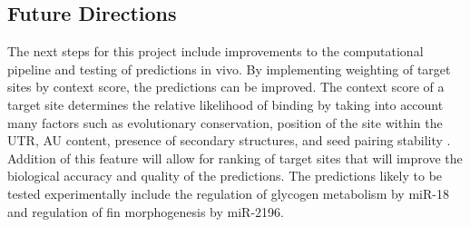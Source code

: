 \documentclass[12pt]{article}
\begin{document}
\subsection{Future Directions}

The next steps for this project include improvements to the computational pipeline and testing of predictions in vivo. By implementing weighting of target sites by context score, the predictions can be improved. The context score of a target site determines the relative likelihood of binding by taking into account many factors such as evolutionary conservation, position of the site within the UTR, AU content, presence of secondary structures, and seed pairing stability \cite{agarwal2015predicting}. Addition of this feature will allow for ranking of target sites that will improve the biological accuracy and quality of the predictions. The predictions likely to be tested experimentally include the regulation of glycogen metabolism by miR-18 and regulation of fin morphogenesis by miR-2196.

\newpage


\newpage

\end{document}
